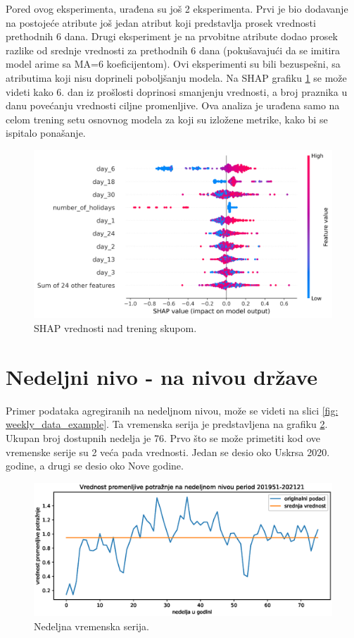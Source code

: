 \documentclass[12pt,oneside]{memoir}
\begin{document}
Pored ovog eksperimenta, urađena su još 2 eksperimenta. Prvi je bio dodavanje na postojeće atribute još jedan atribut koji predstavlja prosek vrednosti prethodnih 6 dana. Drugi eksperiment je na prvobitne atribute dodao prosek razlike od srednje vrednosti za prethodnih 6 dana (pokušavajući da se imitira model arime sa MA=6 koeficijentom). Ovi eksperimenti su bili bezuspešni, sa atributima koji nisu doprineli poboljšanju modela. Na SHAP grafiku \ref{fig: shap_xgboost} se može videti kako 6. dan iz prošlosti doprinosi smanjenju vrednosti, a broj praznika u danu povećanju vrednosti ciljne promenljive. Ova analiza je urađena samo na celom trening setu osnovnog modela za koji su izložene metrike, kako bi se ispitalo ponašanje.
\begin{figure}[!ht]
  \centering
  \includegraphics[width=1\textwidth]{./grafici/shap_xgboost_dnevni.png}
  \caption{SHAP vrednosti nad trening skupom.}
  \label{fig: shap_xgboost}
\end{figure}

\section{Nedeljni nivo - na nivou države}
Primer podataka agregiranih na nedeljnom nivou, može se videti na slici \ref{fig: weekly_data_example}. Ta vremenska serija je predstavljena na grafiku \ref{fig: nedeljna_serija}. Ukupan broj dostupnih nedelja je 76. Prvo što se može primetiti kod ove vremenske serije su 2 veća pada vrednosti. Jedan se desio oko Uskrsa 2020. godine, a drugi se desio oko Nove godine.
\begin{figure}[!ht]
  \centering
  \includegraphics[width=1\textwidth]{./grafici/nedeljna_vremenska_serija.eps}
  \caption{Nedeljna vremenska serija.}
  \label{fig: nedeljna_serija}
\end{figure}
\end{document}
